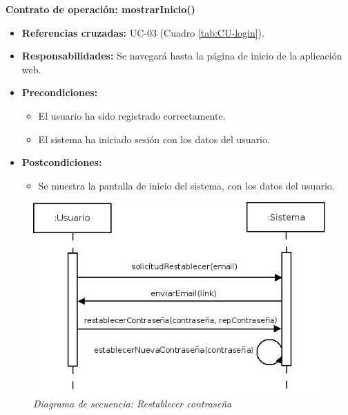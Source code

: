 \textbf{Contrato de operación: mostrarInicio()}
\begin{itemize}
\item \textbf{Referencias cruzadas:} UC-03 (Cuadro \ref{tab:CU-login}).
\item \textbf{Responsabilidades:} Se navegará hasta la página de inicio de la aplicación web.
\item \textbf{Precondiciones:} 
 \begin{itemize}
\item El usuario ha sido registrado correctamente.
\item El sistema ha iniciado sesión con los datos del usuario.
\end {itemize}
\item \textbf{Postcondiciones:} 
 \begin{itemize}
\item Se muestra la pantalla de inicio del sistema, con los datos del usuario.
\end {itemize}
\end {itemize}


\vspace{10mm}

\begin{figure}[H]
\centering
  \includegraphics[scale=.55]{img/secuencias/gestion-usuarios-restablecer-contrasena.jpeg}
  \caption{\textit{Diagrama de secuencia: Restablecer contraseña}}
  \label{fig:secuencia-gestion-usuarios-restablecer-contrasena}
\end{figure}


